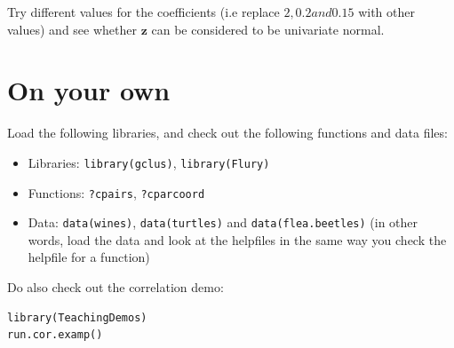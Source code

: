 Try different values for the coefficients (i.e replace $2, 0.2 and 0.15$ with other values) and see whether $\boldsymbol{z}$ can be considered to be univariate normal.


\section{On your own}

Load the following libraries, and check out the following functions and data files:   

\begin{itemize}
\item Libraries: \texttt{library(gclus)}, \texttt{library(Flury)}
\item Functions: \texttt{?cpairs}, \texttt{?cparcoord} 
\item Data: \texttt{data(wines)}, \texttt{data(turtles)} and \texttt{data(flea.beetles)} (in other words, load the data and look at the helpfiles in the same way you check the helpfile for a function)
\end{itemize}



Do also check out the correlation demo:

\begin{verbatim}
library(TeachingDemos)
run.cor.examp()
\end{verbatim}








